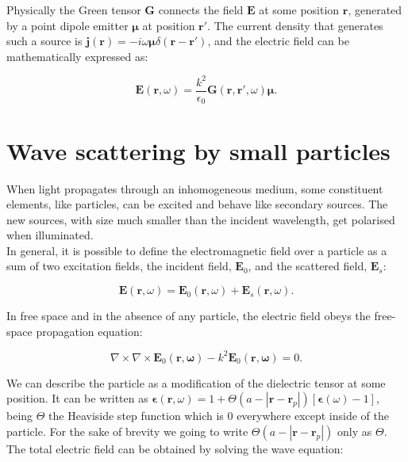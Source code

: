 Physically the Green tensor $\mathbf{G}$  connects the field $\mathbf{E}$ at some position $\mathbf{r}$, generated by a point dipole emitter $\boldsymbol{\mu}$ at position $\mathbf{r}'$. The current density that generates such a source is
$\mathbf{j}\left(\mathbf{r}\right) = -i\omega \boldsymbol{\mu} \delta \left(\mathbf{r}-\mathbf{r}'\right)$, and the electric field can be mathematically expressed as:

\begin{equation}
\mathbf{E}\left(\mathbf{r},\omega\right) = \frac{k^2}{\epsilon_{0}}\mathbf{G}\left(\mathbf{r},\mathbf{r}',\omega\right)\boldsymbol{\mu}.\label{eq:EM_source}
\end{equation}

\section{Wave scattering by small particles\label{sec:Wave_scatt_small_part}}

When light propagates through an inhomogeneous medium, some constituent elements, like particles, can be excited and behave like secondary sources. The new sources, with size much smaller than the incident wavelength, get polarised when illuminated.\\
In general, it is possible to define the electromagnetic field over a particle as a sum of two excitation fields, the incident field, $\mathbf{E}_{0}$, and the scattered field, $\mathbf{E}_s$:

\begin{equation}
\mathbf{E}\left(\mathbf{r},\omega\right) = \mathbf{E}_{0}\left(\mathbf{r},\omega\right) + \mathbf{E}_s\left(\mathbf{r},\omega\right). \label{eq:fields}
\end{equation}

In free space and in the absence of any particle, the electric field obeys the free-space propagation equation:

\begin{equation}
\nabla \times \nabla \times \mathbf{E}_{0}\left(\mathbf{r,\omega}\right) - k^2 \mathbf{E}_{0}\left(\mathbf{r,\omega}\right) = 0. \label{eq:wa_eq_totfield}
\end{equation}

We can describe the particle as a modification of the dielectric tensor at some position. It can be written as  $\boldsymbol{\epsilon}\left(\mathbf{r},\omega\right) = 1+\Theta\left(a-\left|\mathbf{r}-\mathbf{r}_p\right|\right)\left[\boldsymbol{\epsilon}\left(\omega\right)-1\right]$, being $\Theta$ the Heaviside step function which is $0$ everywhere except inside of the particle. For the sake of brevity we going to write $\Theta\left(a-\left|\mathbf{r}-\mathbf{r}_p\right|\right)$ only as $\Theta$.\\
The total electric field can be obtained by solving the wave equation:

